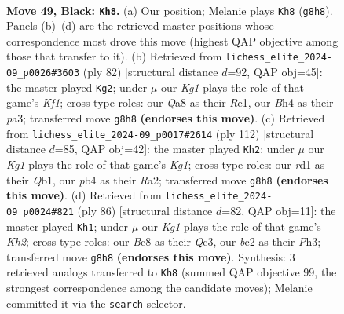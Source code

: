 \documentclass[11pt]{article}
\begin{document}
\begin{figure}[p]
\label{fig:thought-m95}
\end{figure}

\clearpage

\begin{figure}[p]\centering
\begin{subfigure}{0.46\textwidth}\centering
\resizebox{\linewidth}{!}{%
\newchessgame
\chessboard[
  setfen={qrb3k1/p1p2pp1/1p3n2/7p/1P3P1b/B3Q2P/P1B3P1/3R3K b - - 6 49},
  showmover=false,
  pgfstyle=straightmove, color=movearrow, markmove={g8-h8}
]}
\caption{}
\end{subfigure}\hfill
\begin{subfigure}{0.46\textwidth}\centering
\resizebox{\linewidth}{!}{%
\newchessgame
\chessboard[
  setfen={4b1rk/4q3/4pbpP/3p4/1p1P4/pP1B1NQ1/P4P2/4RK2 w - - 0 42},
  showmover=false,
  pgfstyle=straightmove, color=movearrow, markmove={f1-g2}
]}
\caption{}
\end{subfigure}
\\[4pt]
\begin{subfigure}{0.46\textwidth}\centering
\resizebox{\linewidth}{!}{%
\newchessgame
\chessboard[
  setfen={3r1b1k/2q3p1/2b2p1p/p3p3/P1P5/2B1P2P/R2N1PP1/1Q4K1 w - - 41 57},
  showmover=false,
  pgfstyle=straightmove, color=movearrow, markmove={g1-h2}
]}
\caption{}
\end{subfigure}\hfill
\begin{subfigure}{0.46\textwidth}\centering
\resizebox{\linewidth}{!}{%
\newchessgame
\chessboard[
  setfen={8/p4p1k/Pnbq2p1/2p3r1/5N1p/2Q1P2P/5PPK/2R2B2 w - - 23 44},
  showmover=false,
  pgfstyle=straightmove, color=movearrow, markmove={h2-h1}
]}
\caption{}
\end{subfigure}
\caption{\textbf{Move 49, Black: \texttt{Kh8}.} (a) Our position; Melanie plays \texttt{Kh8} (\texttt{g8h8}). Panels (b)--(d) are the retrieved master positions whose correspondence most drove this move (highest QAP objective among those that transfer to it). (b) Retrieved from \texttt{lichess\_elite\_2024-09\_p0026\#3603} (ply 82) [structural distance $d$=92, QAP obj=45]: the master played \texttt{Kg2}; under $\mu$ our \emph{Kg1} plays the role of that game's \emph{Kf1}; cross-type roles: our \emph{Q}a8 as their \emph{R}e1, our \emph{B}h4 as their \emph{p}a3; transferred move \texttt{g8h8} \textbf{(endorses this move)}. (c) Retrieved from \texttt{lichess\_elite\_2024-09\_p0017\#2614} (ply 112) [structural distance $d$=85, QAP obj=42]: the master played \texttt{Kh2}; under $\mu$ our \emph{Kg1} plays the role of that game's \emph{Kg1}; cross-type roles: our \emph{r}d1 as their \emph{Q}b1, our \emph{p}b4 as their \emph{R}a2; transferred move \texttt{g8h8} \textbf{(endorses this move)}. (d) Retrieved from \texttt{lichess\_elite\_2024-09\_p0024\#821} (ply 86) [structural distance $d$=82, QAP obj=11]: the master played \texttt{Kh1}; under $\mu$ our \emph{Kg1} plays the role of that game's \emph{Kh2}; cross-type roles: our \emph{B}c8 as their \emph{Q}c3, our \emph{b}c2 as their \emph{P}h3; transferred move \texttt{g8h8} \textbf{(endorses this move)}. Synthesis: 3 retrieved analogs transferred to \texttt{Kh8} (summed QAP objective 99, the strongest correspondence among the candidate moves); Melanie committed it via the \texttt{search} selector.}

\end{figure}
\end{document}
